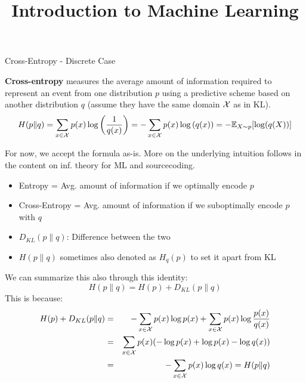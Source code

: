 \documentclass[11pt,compress,t,notes=noshow, xcolor=table]{beamer}
\title{Introduction to Machine Learning}
\begin{document}
    

\begin{vbframe} {Cross-Entropy - Discrete Case}

\textbf{Cross-entropy} measures the average amount of information required to represent an event from one distribution $p$ using a predictive scheme based on another distribution $q$ (assume they have the same domain $\mathcal{X}$ as in KL).
  $$ H(p \| q) = \sum_{x \in \mathcal{X}} p(x) \log\left(\frac{1}{q(x)}\right) = - \sum_{x \in \mathcal{X}} p(x) \log\left(q(x)\right) = - \mathbb{E}_{X\sim p}[\log(q(X))]$$

For now, we accept the formula as-is. More on the underlying intuition follows in the content on inf. theory for ML and sourcecoding.
\begin{itemize}
\setlength{\itemsep}{0.9em}
\item Entropy = Avg. amount of information if we optimally encode $p$
\item Cross-Entropy = Avg. amount of information if we suboptimally encode $p$ with $q$
\item $D_{KL}(p \| q)$: Difference between the two
\item $H(p \| q)$ sometimes also denoted as $H_{q}(p)$ to set it apart from KL
\end{itemize}

\framebreak

We can summarize this also through this identity: 
\lz
$$
H(p \| q) = H(p) + D_{KL}(p \| q)
$$
This is because: 
\begin{eqnarray*}
H(p) + D_{KL}(p \| q) &=& - \sum_{x \in \mathcal{X}} p(x) \log p(x) + \sum_{x \in \mathcal{X}} p(x) \log \frac{p(x)}{q(x)} \\
                      &=& \sum_{x \in \mathcal{X}} p(x) (-\log p(x) +  \log p(x) - \log q(x)) \\
&=& - \sum_{x \in \mathcal{X}} p(x) \log q(x) = H(p \| q) \\
\end{eqnarray*}
   
\framebreak
\end{vbframe}
\end{document}
